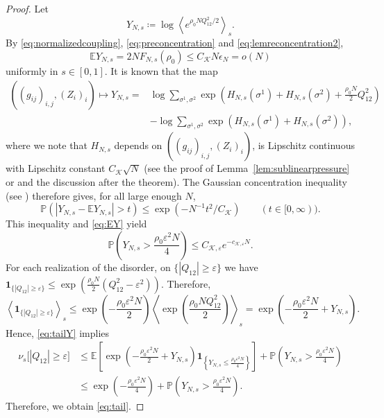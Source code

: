 \documentclass[11pt]{article}
\numberwithin{equation}{section}
\newcommand{\E}{\mathbb{E}}
\newcommand{\1}{\mathbf 1}
\newcommand{\cK}{\mathcal K}
\newcommand{\braket}[1]{\left\langle #1\right\rangle}
\begin{document}
\begin{proof}
Let
\[
 Y_{N,s}
 \coloneqq\log\braket{e^{\rho_0NQ_{12}^2/2}}_s.
\]
By \eqref{eq:normalizedcoupling}, \eqref{eq:preconcentration} and \eqref{eq:lemreconcentration2},
\begin{equation}\label{eq:EY}
 \E Y_{N,s}=2NF_{N,s}(\rho_0)
 \le C_{\cK} N\epsilon_N=o(N)
\end{equation}
uniformly in $s\in [0,1]$.
It is known that the map
\begin{align*}
((g_{ij})_{i,j}, (Z_i)_{i}) \mapsto Y_{N,s} = & \log
 \sum_{\sigma^1,\sigma^2}
 \exp\left(
 H_{N,s}(\sigma^1)+H_{N,s}(\sigma^2)
 +\frac{\rho _0 N}{2}Q_{12}^2\right) \\
&- \log
 \sum_{\sigma^1,\sigma^2}
 \exp\left(
 H_{N,s}(\sigma^1)+H_{N,s}(\sigma^2)
 \right) ,
\end{align*}
where we note that $H_{N,s}$ depends on $((g_{ij})_{i,j}, (Z_i)_{i})$, is Lipschitz continuous with Lipschitz constant $C_{\cK}\sqrt{N}$
(see the proof of Lemma~\ref{lem:sublinearpressure} or \cite[Theorem~1.3.5]{Talagrand} and the discussion after the theorem).
The Gaussian concentration inequality
(see \cite[Theorem~1.3.4]{Talagrand})
therefore gives, for all
large enough $N$,
\[
 \mathbb P\left(
 |Y_{N,s} - \mathbb E Y_{N,s}|> t \right)
\le \exp \left( - N^{-1 } t^2/C_{\cK}  \right) \qquad (t\in [0,\infty )).
\]
This inequality and \eqref{eq:EY} yield
\begin{equation}\label{eq:tailY}
\mathbb P\left(
 Y_{N,s}>\frac{\rho_0\varepsilon^2N}{4}\right) \le C_{\cK,\varepsilon}e^{-c_{\cK,\varepsilon}N}.
\end{equation}
For each realization of the disorder, on $\{|Q_{12}|\ge\varepsilon\}$ we have
\(
\1_{\{|Q_{12}|\ge\varepsilon\}}
\le
\exp\left(
\frac{\rho_0N}{2}(Q_{12}^2-\varepsilon^2)
\right).
\) 
Therefore,
\[
\left\langle \1_{\{|Q_{12}|\ge\varepsilon\}}\right\rangle_s
\le
\exp\left(-\frac{\rho_0\varepsilon^2N}{2}\right)
\left\langle
\exp\left(\frac{\rho_0NQ_{12}^2}{2}\right)
\right\rangle_s
=
\exp\left(
-\frac{\rho_0\varepsilon^2N}{2}+Y_{N,s}
\right).
\]
Hence, 
\eqref{eq:tailY} implies
\begin{align*}
\nu_s\bigl[|Q_{12}|\ge\varepsilon\bigr]
&\le
\E\left[
\exp\left(
-\frac{\rho_0\varepsilon^2N}{2}+Y_{N,s}
\right)
\1_{\left\{Y_{N,s}\le \frac{\rho_0\varepsilon^2N}{4}\right\}}
\right]
+
\mathbb P\left(
Y_{N,s}>\frac{\rho_0\varepsilon^2N}{4}
\right)
\\
&\le
\exp\left(-\frac{\rho_0\varepsilon^2N}{4}\right)
+
\mathbb P\left(
Y_{N,s}>\frac{\rho_0\varepsilon^2N}{4}
\right).
\end{align*}
Therefore, we obtain \eqref{eq:tail}.
\end{proof}
\end{document}

